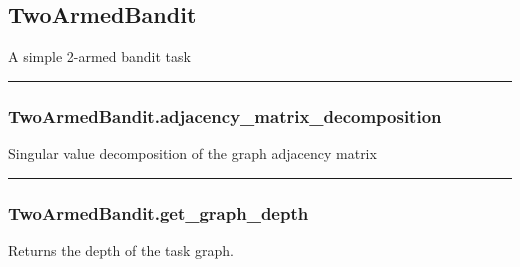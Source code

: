 \hypertarget{twoarmedbandit}{%
\subsection{TwoArmedBandit}\label{twoarmedbandit}}

\begin{Shaded}
\begin{Highlighting}[]
\end{Highlighting}
\end{Shaded}

A simple 2-armed bandit task

\begin{center}\rule{0.5\linewidth}{\linethickness}\end{center}

\hypertarget{twoarmedbandit.adjacency_matrix_decomposition}{%
\subsubsection{TwoArmedBandit.adjacency\_matrix\_decomposition}\label{twoarmedbandit.adjacency_matrix_decomposition}}

\begin{Shaded}
\begin{Highlighting}[]
\NormalTok{)}
\end{Highlighting}
\end{Shaded}

Singular value decomposition of the graph adjacency matrix

\begin{center}\rule{0.5\linewidth}{\linethickness}\end{center}

\hypertarget{twoarmedbandit.get_graph_depth}{%
\subsubsection{TwoArmedBandit.get\_graph\_depth}\label{twoarmedbandit.get_graph_depth}}

\begin{Shaded}
\begin{Highlighting}[]
\NormalTok{)}
\end{Highlighting}
\end{Shaded}

Returns the depth of the task graph.

